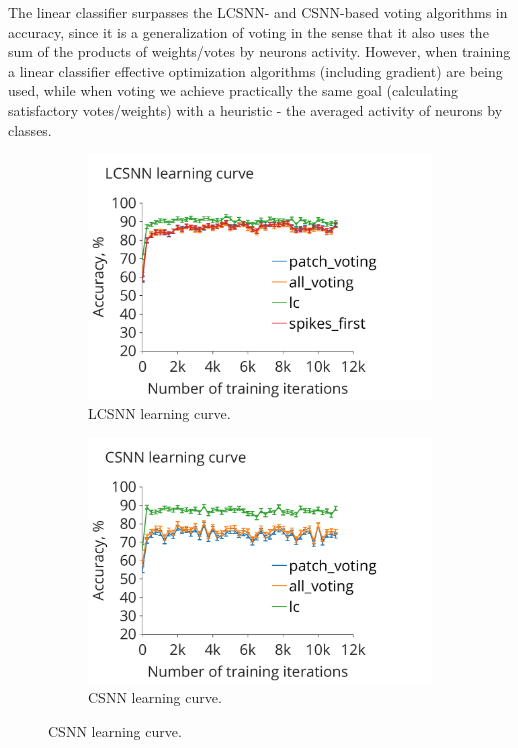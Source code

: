 \documentclass[a4paper]{article}
\begin{document}
The linear classifier surpasses the LCSNN- and CSNN-based voting algorithms in accuracy, since it is a generalization of voting in the sense that it also uses the sum of the products of weights/votes by neurons activity. However, when training a linear classifier effective optimization algorithms (including gradient) are being used, while when voting we achieve practically the same goal (calculating satisfactory votes/weights) with a heuristic - the averaged activity of neurons by classes.

\begin{figure}
\centering
\begin{subfigure}{0.48\textwidth}
    \includegraphics[width=\textwidth,keepaspectratio=true]{LCSNN_learning_rate.pdf}
 \caption{LCSNN learning curve.}
 \label{LCSNN_learning_curve}
\end{subfigure} 
\begin{subfigure}{0.48\textwidth} 
    \includegraphics[width=\textwidth,keepaspectratio=true]{CSNN_learning_rate.pdf}
 \caption{CSNN learning curve.}
 \label{CSNN_learning_curve}
\end{subfigure} 
\end{figure}
\end{document}
